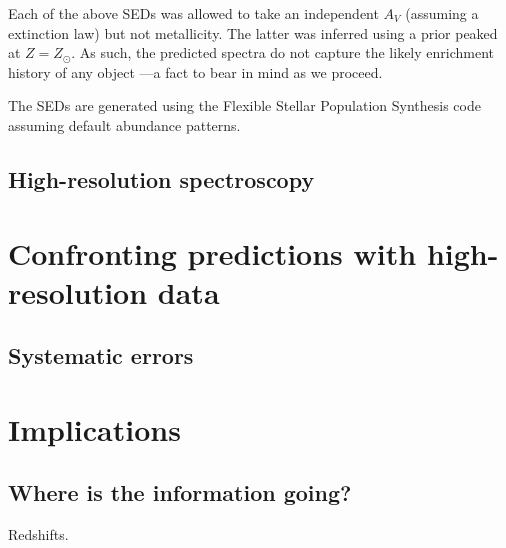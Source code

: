 \documentclass[a4paper,fleqn,usenatbib]{mnras}
\begin{document}
Each of the above SEDs was allowed to take an independent $A_{V}$ (assuming a \citealt{Calzetti00} 
extinction law) but not metallicity. The latter was inferred using a prior peaked at $Z=Z_{\odot}$. As such,
the predicted spectra do not capture the likely enrichment history of any object 
\citep[cf.][]{Pacifici12, Morishita19}---a fact to bear in mind as we proceed.

The SEDs are generated using the Flexible Stellar Population Synthesis code \citep{ConroyGunnWhite09}
assuming default abundance patterns.

\subsection{High-resolution spectroscopy}
\label{sec: hiRes}




\section{Confronting predictions with high-resolution data}
\label{sec:results}

\subsection{Systematic errors}
\label{sec:systematics}



\section{Implications}
\label{sec:discussion}

\subsection{Where is the information going?}
\label{sec:redshifts}

Redshifts.
\end{document}
